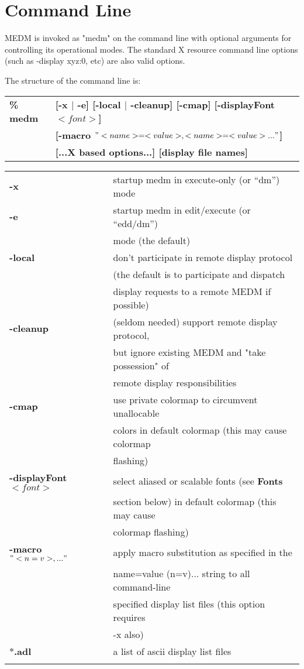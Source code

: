 \section{Command Line}

MEDM is invoked as "medm" on the command line with optional arguments
for controlling its operational modes.  The standard X resource command
line options (such as -display xyz:0, etc) are also valid options.

\noindent The structure of the command line is:\\

\begin{tabular}{ll}
{\bf \% medm} & {\bf [-x $|$ -e] [-local $|$ -cleanup] [-cmap]
[-displayFont $<font>$]}\\
	&  {\bf [-macro $"<name>=<value>,<name>=<value>..."$]}\\
	& {\bf [...X based options...] [display file names]} \\
\end{tabular}

\vspace{12pt}
\begin{tabular}{ll}
{\bf -x}	& startup medm in execute-only (or ``dm'') mode\\
{\bf -e}	& startup medm in edit/execute (or ``edd/dm'')\\
		& mode (the default)\\
{\bf -local}	& don't participate in remote display protocol\\
		& (the default is to participate and dispatch\\
		& display requests to a remote MEDM if possible)\\
{\bf -cleanup}	& (seldom needed) support remote display protocol,\\
		& but ignore existing MEDM and "take possession" of\\
		& remote display responsibilities\\
{\bf -cmap}	& use private colormap to circumvent unallocable\\
		& colors in default colormap (this may cause colormap\\
		&  flashing)\\
{\bf -displayFont $<font>$} & select aliased or scalable fonts (see {\bf Fonts}\\
		& section below) in default colormap (this may cause\\
		& colormap flashing)\\
{\bf -macro $"<n=v>,..."$}    &  apply macro substitution as specified in the\\
		& name=value (n=v)... string to all command-line\\
		& specified display list files (this option requires\\
		& -x also)\\
{\bf $*$.adl}	& a list of ascii display list files\\
\\
\end{tabular}

